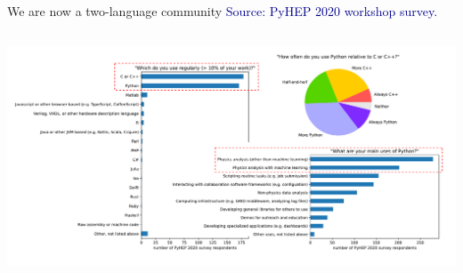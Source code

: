 \documentclass[aspectratio=169]{beamer}
\begin{document}
\begin{frame}{We are now a two-language community}
\vspace{0.25 cm}
\textcolor{darkblue}{Source: PyHEP 2020 workshop survey.}

\vspace{-0.3 cm}
\begin{columns}
\includegraphics[width=\linewidth]{PLOTS/pyhep2020-survey-5.pdf}
\end{columns}
\end{frame}


\begin{frame}{}

\end{frame}
\end{document}
